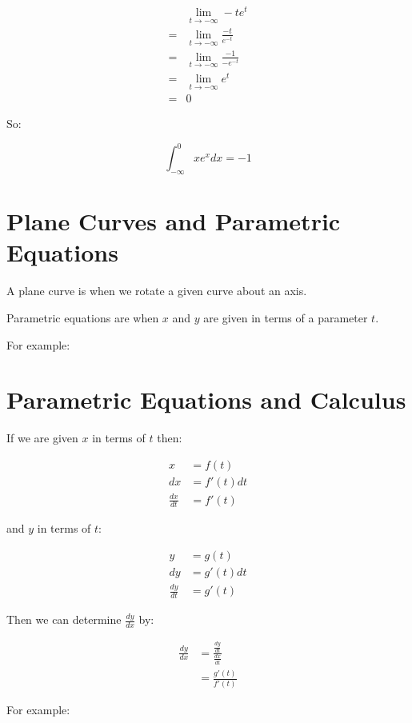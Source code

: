 \documentclass{article}
\begin{document}
\begin{align*}
  &\lim_{t \to -\infty} -te^t \\
  = &\lim_{t \to -\infty} \frac{-t}{e^{-t}} \\
  = &\lim_{t \to -\infty} \frac{-1}{-e^{-t}} \\
  = &\lim_{t \to -\infty} e^{t} \\
  = &0
\end{align*}

So:

\begin{displaymath}
  \int^0_{-\infty} x e^x dx = -1
\end{displaymath}

\section{Plane Curves and Parametric Equations}

A plane curve is when we rotate a given curve about an axis.

Parametric equations are when $x$ and $y$ are given in terms of a parameter $t$.

For example:

\section{Parametric Equations and Calculus}

If we are given $x$ in terms of $t$ then:

\begin{align*}
  x &= f(t) \\
  dx &= f'(t)dt \\
  \frac{dx}{dt} &= f'(t)
\end{align*}

and $y$ in terms of $t$:

\begin{align*}
  y &= g(t) \\
  dy &= g'(t)dt \\
  \frac{dy}{dt} &= g'(t)
\end{align*}

Then we can determine $\frac{dy}{dx}$ by:

\begin{align*}
  \frac{dy}{dx} &= \frac{ \frac{dy}{dt} }{ \frac{dx}{dt} } \\
  &= \frac{g'(t)}{f'(t)}
\end{align*}

For example:
\end{document}
